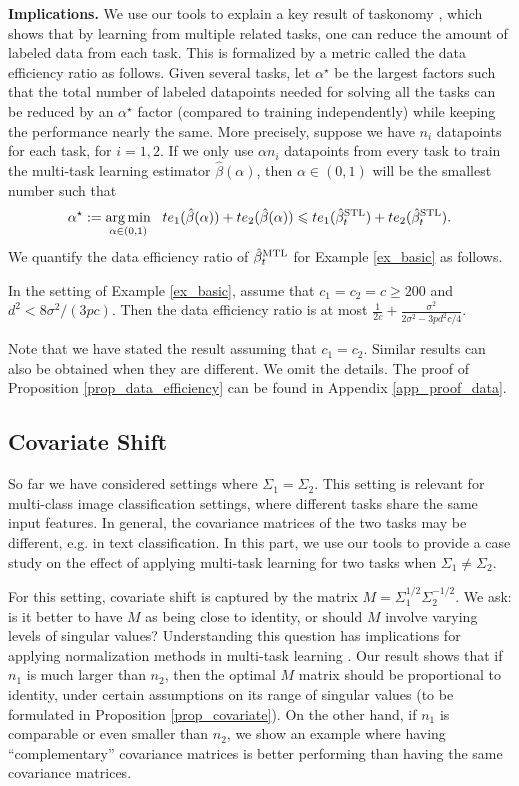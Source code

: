 \textbf{Implications.} We use our tools to explain a key result of taskonomy \cite{ZSSGM18}, which shows that by learning from multiple related tasks, one can reduce the amount of labeled data from each task.
This is formalized by a metric called the data efficiency ratio as follows.
Given several tasks, let $\alpha^{\star}$ be the largest factors such that the total number of labeled datapoints needed for solving all the tasks can be reduced by an $\alpha^{\star}$ factor (compared to training independently) while keeping the performance nearly the same.
More precisely, suppose we have $n_i$ datapoints for each task, for $i= 1, 2$.
If we only use $\alpha n_i$ datapoints from every task to train the multi-task learning estimator $\hat{\beta}(\alpha)$, then $\alpha \in (0, 1)$ will be the smallest number such that
\[ \alpha^{\star} :=\operatorname*{arg\,min}_{\alpha\in(0, 1)} ~~ te_1(\hat{\beta}(\alpha)) + te_2(\hat{\beta}(\alpha))\leqslant te_1(\hat{\beta}_t^{\text{STL}}) + te_2(\hat{\beta}_t^{\text{STL}}). \]
We quantify the data efficiency ratio of $\hat{\beta}_t^{\text{MTL}}$ for Example \ref{ex_basic} as follows.

\begin{proposition}\label{prop_data_efficiency}
	In the setting of Example \ref{ex_basic}, assume that $c_1 = c_2 = c \ge 200$ and $d^2 < {8\sigma^2} /{(3p c)}$.
	Then the data efficiency ratio is at most $\frac{1}{2c} + \frac{\sigma^2}{2\sigma^2 - 3p d^2 c / 4}$.
\end{proposition}
Note that we have stated the result assuming that $c_1 = c_2$.
Similar results can also be obtained when they are different.
We omit the details.
The proof of Proposition \ref{prop_data_efficiency} can be found in Appendix \ref{app_proof_data}.




\subsection{Covariate Shift}\label{sec_covariate}

So far we have considered settings where $\Sigma_1 = \Sigma_2$.
This setting is relevant for multi-class image classification settings, where different tasks share the same input features.
In general, the covariance matrices of the two tasks may be different, e.g. in text classification.
In this part, we use our tools to provide a case study on the effect of applying multi-task learning for two tasks when $\Sigma_1 \neq \Sigma_2$.

For this setting, covariate shift is captured by the matrix $M = \Sigma_1^{1/2} \Sigma_2^{-1/2}$.
We ask: is it better to have $M$ as being close to identity, or should $M$ involve varying levels of singular values?
Understanding this question has implications for applying normalization methods in multi-task learning \cite{LV19,CBLR18,YKGLHF20}.
Our result shows that if $n_1$ is much larger than $n_2$, then the optimal $M$ matrix should be proportional to identity, under certain assumptions on its range of singular values (to be formulated in Proposition \ref{prop_covariate}).
On the other hand, if $n_1$ is comparable or even smaller than $n_2$, we show an example where having ``complementary'' covariance matrices is better performing than having the same covariance matrices.

